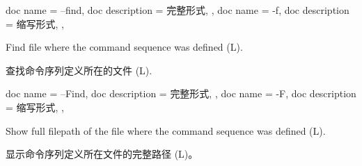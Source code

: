 \begin{docKeys}[
    doc no index,   %
    doc parameter = {~},
    ]
    {
    {
        doc name        = --find,
        doc description = 完整形式,
    },
    {
        doc name        = -f,
        doc description = 缩写形式,
    },
    }
    
Find file where the command sequence was defined (L).

查找命令序列定义所在的文件 (L).
    
\end{docKeys}
    
    

\begin{docKeys}[
    doc no index,   %
    doc parameter = {~},
    ]
    {
    {
        doc name        = --Find,
        doc description = 完整形式,
    },
    {
        doc name        = -F,
        doc description = 缩写形式,
    },
}

Show full filepath of the file where the command sequence was defined (L).

显示命令序列定义所在文件的完整路径 (L)。
    
\end{docKeys}
    
    